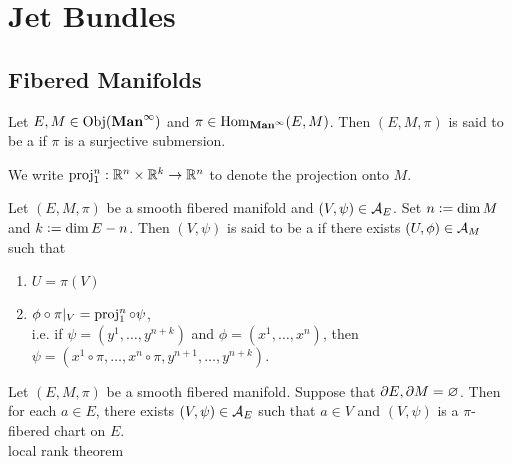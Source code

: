 \documentclass{book}
\begin{document}
\chapter{Jet Bundles}

\section{Fibered Manifolds}

\begin{defn} 
	Let $E, M \in \operatorname{Obj}(\operatorname*{\text{\textbf{Man}}^{\infty}})$ and $\pi \in \operatorname{Hom}_{\operatorname*{\text{\textbf{Man}}^{\infty}}}(E, M)$. Then $(E, M, \pi)$ is said to be a  if $\pi$ is a surjective submersion. 
\end{defn}

\begin{note}
	We write $\operatorname{\text{proj}}^n_1: \mathbb{R}^n \times \mathbb{R}^k \rightarrow \mathbb{R}^n$ to denote the projection onto $M$.
\end{note}

\begin{defn} 
	Let $(E, M, \pi)$ be a smooth fibered manifold and $(V, \psi) \in \mathcal{A}_{E}$. Set $n \vcentcolon= \dim M$ and $k \vcentcolon= \dim E - n$. Then $(V, \psi)$ is said to be a  if there exists $(U, \phi) \in \mathcal{A}_{M}$ such that 
	\begin{enumerate}
		\item $U = \pi(V)$
		\item $\phi \circ \pi|_V = \operatorname{\text{proj}}^n_1 \circ \psi$, \\
		i.e. if $\psi = (y^1, \ldots, y^{n+k})$ and $\phi = (x^1, \ldots, x^n)$, then $\psi = (x^1 \circ \pi, \ldots, x^n \circ \pi, y^{n+1}, \ldots, y^{n+k})$.
	\end{enumerate}
\end{defn}

\begin{ex} 
	Let $(E, M, \pi)$ be a smooth fibered manifold. Suppose that $\partial E, \partial M = \varnothing$. Then for each $a \in E$, there exists $(V, \psi) \in \mathcal{A}_E$ such that $a \in V$ and $(V, \psi)$ is a $\pi$-fibered chart on $E$. \\
	 local rank theorem 
\end{ex}
\end{document}
